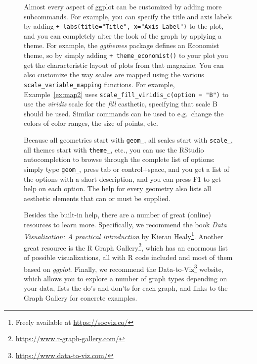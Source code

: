 \begin{figure}
\begin{feature}
Almost every aspect of ggplot can be customized by adding more subcommands.
For example, you can specify the title and axis labels by adding \verb|+ labs(title="Title", x="Axis Label")| to the plot,
and you can completely alter the look of the graph by applying a theme.
For example, the \emph{ggthemes} package defines an Economist theme, so by simply adding \verb|+ theme_economist()| to your plot you get the characteristic layout of plots from that magazine.
You can also customize the way scales are mapped using the various \texttt{scale\_variable\_mapping} functions.
For example, Example~\ref{ex:map2} uses \verb|scale_fill_viridis_c(option = "B")| to use the \emph{viridis} scale for the \emph{fill} easthetic, specifying that scale B should be used. Similar commands can be used to e.g.\ change the colors of color ranges, the size of points, etc.

Because all geometries start with \verb|geom_|, all scales start with \verb|scale_|, all themes start with \verb|theme_|, etc.,
you can use the RStudio autocompletion to browse through the complete list of options:
simply type \verb|geom_|, press tab or control+space, and you get a list of the options with a short description, and you can press F1 to get help on each option. The help for every geometry also lists all aesthetic elements that can or must be supplied.

\newcommand{\fnviza}{\footnote{Freely available at \url{https://socviz.co/}}}
\newcommand{\fnvizb}{\footnote{\url{https://www.r-graph-gallery.com/}}}
\newcommand{\fnvizc}{\footnote{\url{https://www.data-to-viz.com/}}}
\nocite{healy2018data}

Besides the built-in help, there are a number of great (online) resources to learn more. Specifically, we recommend the book \emph{Data Visualization: A practical introduction} by Kieran Healy\footnote{Freely available at \url{https://socviz.co/}}. Another great resource is the R Graph Gallery\footnote{\url{https://www.r-graph-gallery.com/}}, which has an enormous list of possible visualizations, all with R code included and most of them based on \emph{ggplot}. Finally, we recommend the Data-to-Viz\footnote{\url{https://www.data-to-viz.com/}} website, which allows you to explore a number of graph types depending on your data, lists the do's and don'ts for each graph, and links to the Graph Gallery for concrete examples.
\end{feature}
\end{figure}


